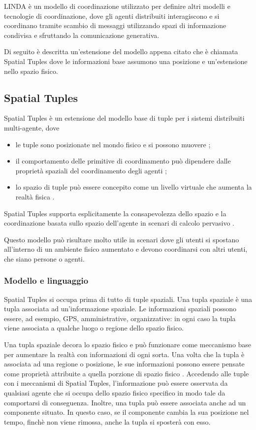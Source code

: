LINDA è un modello di coordinazione utilizzato per definire altri modelli e tecnologie di coordinazione, dove gli agenti distribuiti interagiscono e si coordinano tramite scambio di messaggi utilizzando spazi di informazione condivisa e sfruttando la comunicazione generativa.

Di seguito è descritta un'estensione del modello appena citato che è chiamata Spatial Tuples dove le informazioni base assumono una posizione e un'estensione nello spazio fisico.

\subsection{Spatial Tuples}
Spatial Tuples è un estensione del modello base di tuple per i sistemi distribuiti multi-agente, dove
\begin{itemize}
\item le tuple sono posizionate nel mondo fisico e si possono muovere \cite{SpatialTuples};
\item il comportamento delle primitive di coordinamento può dipendere dalle proprietà spaziali del coordinamento degli agenti \cite{SpatialTuples};
\item lo spazio di tuple può essere concepito come un livello virtuale che aumenta la realtà fisica \cite{SpatialTuples}.
\end{itemize}
Spatial Tuples supporta esplicitamente la consapevolezza dello spazio e la coordinazione basata sullo spazio dell'agente in scenari di calcolo pervasivo \cite{SpatialTuples}.

Questo modello può risultare molto utile in scenari dove gli utenti si spostano all'interno di un ambiente fisico aumentato e devono coordinarsi con altri utenti, che siano persone o agenti.

\subsubsection{Modello e linguaggio}
Spatial Tuples si occupa prima di tutto di tuple spaziali. Una tupla spaziale è una tupla associata ad un'informazione spaziale. Le informazioni spaziali possono essere, ad esempio, GPS, amministrative, organizzative: in ogni caso la tupla viene associata a qualche luogo o regione dello spazio fisico.

Una tupla spaziale decora lo spazio fisico e può funzionare come meccanismo base per aumentare la realtà con informazioni di ogni sorta. Una volta che la tupla è associata ad una regione o posizione, le sue informazioni possono essere pensate come proprietà attribuite a quella porzione di spazio fisico \cite{SpatialTuples}. Accedendo alle tuple con i meccanismi di Spatial Tuples, l'informazione può essere osservata da qualsiasi agente che si occupa dello spazio fisico specifico in modo tale da comportarsi di conseguenza.
%
Inoltre, una tupla può essere associata anche ad un componente situato. In questo caso, se il componente cambia la sua posizione nel tempo, finchè non viene rimossa, anche la tupla si sposterà con esso.

